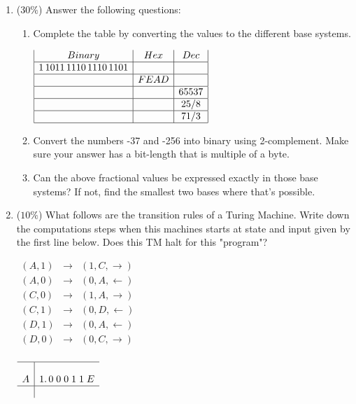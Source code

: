 \documentclass{article}
\begin{document}
\begin{enumerate}
\item ($30\%$) Answer the following questions: 
\begin{enumerate}
\item  Complete the table by converting the values to the different base systems. 

\begin{math}
\begin{array}{|c|c|c|}
Binary & Hex & Dec \\
\hline
1\,1011\,1110\,1110\,1101 & \; & \; \\
\hline
\; & FEAD & \; \\
\hline
\; & \; & 65537 \\
\hline
\; & \; & 25/8 \\
\hline
\; & \; & 71/3 \\
\hline
\end{array}
\end{math}
\item Convert the numbers -37 and -256 into binary using 2-complement. Make sure your answer has a bit-length that is multiple of a byte.
\item Can the above fractional values be expressed exactly in those base systems? If not, find the smallest two bases where that's possible.
\end{enumerate}
\item ($10\%$) What follows are the transition rules of a Turing Machine. Write down the computations steps when this machines starts at state and input given by the first line below. Does this TM halt for this "program"?

\begin{math}
\begin{array}{rcl}
(A,1) & \longrightarrow & (1,C,\rightarrow) \\
(A,0) & \longrightarrow & (0,A,\leftarrow) \\
(C,0) & \longrightarrow & (1,A,\rightarrow) \\
(C,1) & \longrightarrow & (0,D,\leftarrow)  \\
(D,1) & \longrightarrow & (0,A,\leftarrow) \\
(D,0) & \longrightarrow & (0,C,\rightarrow) \\
\end{array}
\end{math}

\begin{math}
\begin{array}{l|r}
\hline \\
A & 1.\,0\;0\;0\;1\;1\;E \\
\hline
\phantom{A} & \phantom{0}
\end{array}
\end{math}


\end{enumerate}
\end{document}
